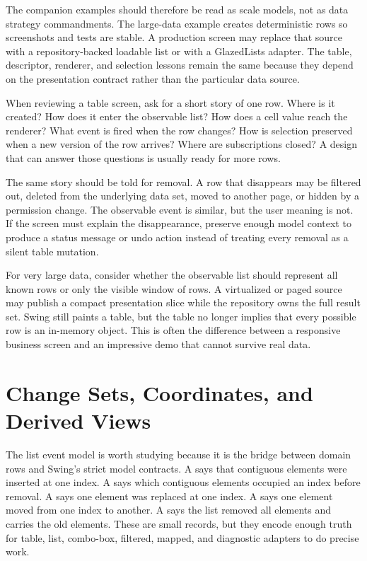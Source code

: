 The companion examples should therefore be read as scale models, not as data
strategy commandments. The large-data example creates deterministic rows so
screenshots and tests are stable. A production screen may replace that source
with a repository-backed loadable list or with a GlazedLists adapter. The table,
descriptor, renderer, and selection lessons remain the same because they depend
on the presentation contract rather than the particular data source.

When reviewing a table screen, ask for a short story of one row. Where is it
created? How does it enter the observable list? How does a cell value reach the
renderer? What event is fired when the row changes? How is selection preserved
when a new version of the row arrives? Where are subscriptions closed? A design
that can answer those questions is usually ready for more rows.

The same story should be told for removal. A row that disappears may be filtered
out, deleted from the underlying data set, moved to another page, or hidden by a
permission change. The observable event is similar, but the user meaning is not.
If the screen must explain the disappearance, preserve enough model context to
produce a status message or undo action instead of treating every removal as a
silent table mutation.

For very large data, consider whether the observable list should represent all
known rows or only the visible window of rows. A virtualized or paged source may
publish a compact presentation slice while the repository owns the full result
set. Swing still paints a table, but the table no longer implies that every
possible row is an in-memory object. This is often the difference between a
responsive business screen and an impressive demo that cannot survive real data.

\section{Change Sets, Coordinates, and Derived Views}

The list event model is worth studying because it is the bridge between domain
rows and Swing's strict model contracts. A  says that
contiguous elements were inserted at one index. A  says
which contiguous elements occupied an index before removal. A
 says one element was replaced at one index. A
 says one element moved from one index to another. A
 says the list removed all elements and carries the old
elements. These are small records, but they encode enough truth for table, list,
combo-box, filtered, mapped, and diagnostic adapters to do precise work.

